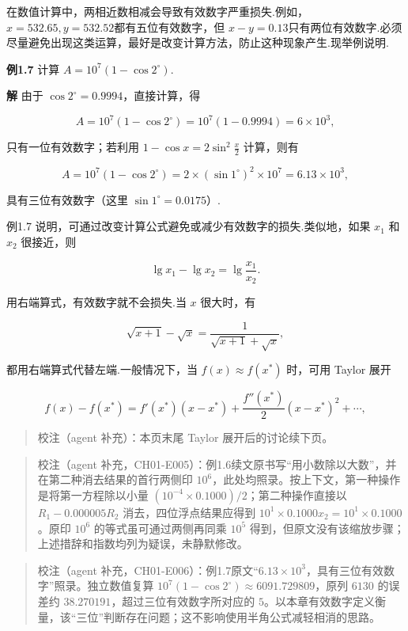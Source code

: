 在数值计算中，两相近数相减会导致有效数字严重损失.例如，\(x=532.65, y=532.52\)都有五位有效数字，但 \(x-y=0.13\)只有两位有效数字.必须尽量避免出现这类运算，最好是改变计算方法，防止这种现象产生.现举例说明.

\textbf{例1.7} 计算 \(A=10^7(1-\cos 2^\circ)\).

\textbf{解} 由于 \(\cos 2^\circ=0.9994\)，直接计算，得

\[
A=10^7(1-\cos 2^\circ)=10^7(1-0.9994)=6 \times 10^3,
\]

只有一位有效数字；若利用 \(1-\cos x=2\sin^2\frac{x}{2}\) 计算，则有

\[
A=10^7(1-\cos 2^\circ)=2 \times (\sin 1^\circ)^2 \times 10^7=6.13 \times 10^3,
\]

具有三位有效数字（这里 \(\sin 1^\circ=0.0175\)）.

例1.7 说明，可通过改变计算公式避免或减少有效数字的损失.类似地，如果 \(x_1\) 和 \(x_2\) 很接近，则

\[
\lg x_1-\lg x_2=\lg \frac{x_1}{x_2}.
\]

用右端算式，有效数字就不会损失.当 \(x\) 很大时，有

\[
\sqrt{x+1}-\sqrt{x}=\frac{1}{\sqrt{x+1}+\sqrt{x}},
\]

都用右端算式代替左端.一般情况下，当 \(f(x)\approx f(x^*)\) 时，可用 Taylor 展开

\[
f(x)-f(x^*)=f'(x^*) (x-x^*)+\frac{f''(x^*)}{2} (x-x^*)^2+\cdots,
\]

\begin{quote}
校注（agent 补充）：本页末尾 Taylor 展开后的讨论续下页。
\end{quote}

\begin{quote}
校注（agent 补充，CH01-E005）：例1.6续文原书写``用小数除以大数''，并在第二种消去结果的首行两侧印 \(10^6\)，此处均照录。按上下文，第一种操作是将第一方程除以小量 \((10^{-4}\times0.1000)/2\)；第二种操作直接以 \(R_1-0.000005R_2\) 消去，四位浮点结果应得到 \(10^1\times0.1000x_2=10^1\times0.1000\)。原印 \(10^6\) 的等式虽可通过两侧再同乘 \(10^5\) 得到，但原文没有该缩放步骤；上述措辞和指数均列为疑误，未静默修改。
\end{quote}

\begin{quote}
校注（agent 补充，CH01-E006）：例1.7原文``\(6.13\times10^3\)，具有三位有效数字''照录。独立数值复算 \(10^7(1-\cos2^\circ)\approx6091.729809\)，原列 \(6130\) 的误差约 \(38.270191\)，超过三位有效数字所对应的 \(5\)。以本章有效数字定义衡量，该``三位''判断存在问题；这不影响使用半角公式减轻相消的思路。
\end{quote}

